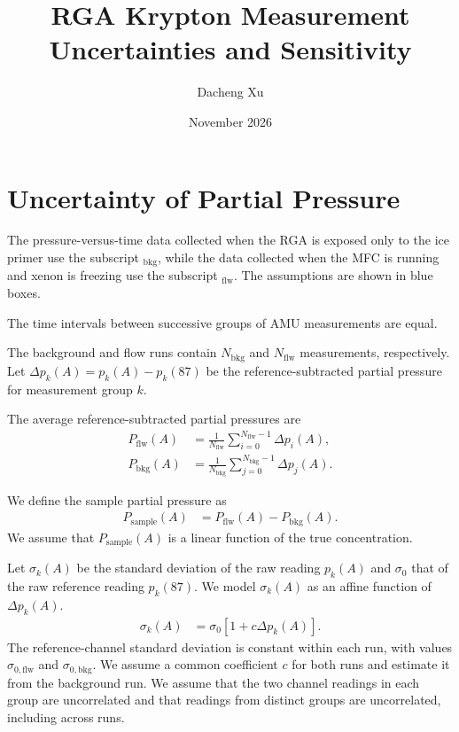 \documentclass{article}
\title{RGA Krypton Measurement Uncertainties and Sensitivity}
\author{Dacheng Xu}
\date{November 2026}
\begin{document}
\maketitle

\section{Uncertainty of Partial Pressure}

The pressure-versus-time data collected when the RGA is exposed only to the ice primer use the subscript $_\mathrm{bkg}$, while the data collected when the MFC is running and xenon is freezing use the subscript $_\mathrm{flw}$. The assumptions are shown in blue boxes.

\begin{keyidea}
    The time intervals between successive groups of AMU measurements are equal.
\end{keyidea}

The background and flow runs contain $N_\mathrm{bkg}$ and $N_\mathrm{flw}$ measurements, respectively. Let $\Delta p_k(A) = p_k(A) - p_k(87)$ be the reference-subtracted partial pressure for measurement group $k$.

The average reference-subtracted partial pressures are
\begin{align}
    P_\mathrm{flw}(A) &= \frac{1}{N_\mathrm{flw}}\sum_{i=0}^{N_\mathrm{flw}-1}\Delta p_i(A), \\
    P_\mathrm{bkg}(A) &= \frac{1}{N_\mathrm{bkg}}\sum_{j=0}^{N_\mathrm{bkg}-1}\Delta p_j(A).
\end{align}

We define the sample partial pressure as
\begin{align}
    P_\mathrm{sample}(A) &= P_\mathrm{flw}(A) - P_\mathrm{bkg}(A).
\end{align}
We assume that $P_\mathrm{sample}(A)$ is a linear function of the true concentration.

\begin{keyidea}
    Let $\sigma_k(A)$ be the standard deviation of the raw reading $p_k(A)$ and $\sigma_0$ that of the raw reference reading $p_k(87)$. We model $\sigma_k(A)$ as an affine function of $\Delta p_k(A)$.
    \begin{align}
        \sigma_k(A) &= \sigma_0\left[1 + c \Delta p_k(A)\right].
    \end{align}
    The reference-channel standard deviation is constant within each run, with values $\sigma_{0,\mathrm{flw}}$ and $\sigma_{0,\mathrm{bkg}}$. We assume a common coefficient $c$ for both runs and estimate it from the background run.
    We assume that the two channel readings in each group are uncorrelated and that readings from distinct groups are uncorrelated, including across runs.
\end{keyidea}
\end{document}
